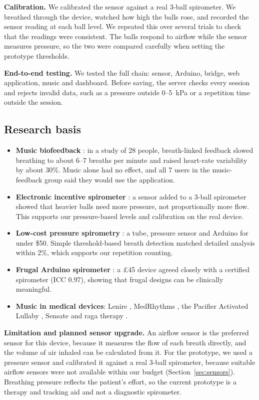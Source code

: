 \documentclass[12pt,a4paper]{article}
\begin{document}
\textbf{Calibration.} We calibrated the sensor against a real 3-ball spirometer. We breathed through the device, watched how high the balls rose, and recorded the sensor reading at each ball level. We repeated this over several trials to check that the readings were consistent. The balls respond to airflow while the sensor measures pressure, so the two were compared carefully when setting the prototype thresholds.

\textbf{End-to-end testing.} We tested the full chain: sensor, Arduino, bridge, web application, music and dashboard. Before saving, the server checks every session and rejects invalid data, such as a pressure outside 0--5~kPa or a repetition time outside the session.

\subsection{Research basis}
\label{sec:research}

\begin{itemize}
  \item \textbf{Music biofeedback} \cite{bhandari}: in a study of 28 people, breath-linked feedback slowed breathing to about 6--7 breaths per minute and raised heart-rate variability by about 30\%. Music alone had no effect, and all 7 users in the music-feedback group said they would use the application.
  \item \textbf{Electronic incentive spirometer} \cite{silva}: a sensor added to a 3-ball spirometer showed that heavier balls need more pressure, not proportionally more flow. This supports our pressure-based levels and calibration on the real device.
  \item \textbf{Low-cost pressure spirometry} \cite{edmunds}: a tube, pressure sensor and Arduino for under \$50. Simple threshold-based breath detection matched detailed analysis within 2\%, which supports our repetition counting.
  \item \textbf{Frugal Arduino spirometer} \cite{wallace}: a \pounds 45 device agreed closely with a certified spirometer (ICC 0.97), showing that frugal designs can be clinically meaningful.
  \item \textbf{Music in medical devices}: Lenire \cite{lenire}, MedRhythms \cite{medrhythms}, the Pacifier Activated Lullaby \cite{pal}, Sensate \cite{sensate} and raga therapy \cite{raga}.
\end{itemize}

\textbf{Limitation and planned sensor upgrade.} An airflow sensor is the preferred sensor for this device, because it measures the flow of each breath directly, and the volume of air inhaled can be calculated from it. For the prototype, we used a pressure sensor and calibrated it against a real 3-ball spirometer, because suitable airflow sensors were not available within our budget (Section~\ref{sec:sensors}). Breathing pressure reflects the patient's effort, so the current prototype is a therapy and tracking aid and not a diagnostic spirometer.
\end{document}
